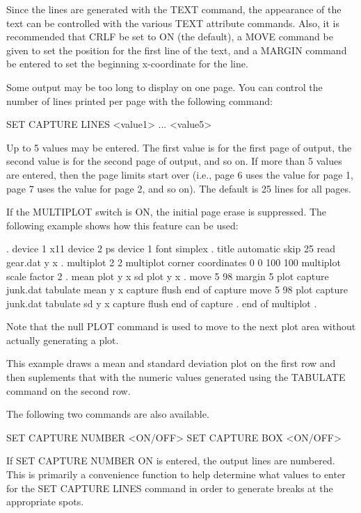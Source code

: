 {    Since the lines are generated with the TEXT command, the
    appearance of the text can be controlled with the various
    TEXT attribute commands.  Also, it is recommended that
    CRLF be set to ON (the default), a MOVE command be given to
    set the position for the first line of the text, and a MARGIN
    command be entered to set the beginning x-coordinate for the
    line.

    Some output may be too long to display on one page.  You
    can control the number of lines printed per page with the
    following command:

        SET CAPTURE LINES <value1>  ... <value5>

    Up to 5 values may be entered.  The first value is for the
    first page of output, the second value is for the second
    page of output, and so on.  If more than 5 values are
    entered, then the page limits start over (i.e., page 6 uses
    the value for page 1, page 7 uses the value for page 2, and
    so on).  The default is 25 lines for all pages.

    If the MULTIPLOT switch is ON, the initial page erase is
    suppressed.  The following example shows how this feature
    can be used:

       .
       device 1 x11
       device 2 ps
       device 1 font simplex
       .
       title automatic
       skip 25
       read gear.dat y x
       .
       multiplot 2 2
       multiplot corner coordinates 0 0 100 100
       multiplot scale factor 2
       .
       mean plot y x
       sd plot y x
       .
       move 5 98
       margin 5
       plot
       capture junk.dat
       tabulate mean y x
       capture flush
       end of capture
       move 5 98
       plot
       capture junk.dat
       tabulate sd y x
       capture flush
       end of capture
       .
       end of multiplot
       .

    Note that the null PLOT command is used to move to the
    next plot area without actually generating a plot.

    This example draws a mean and standard deviation plot
    on the first row and then suplements that with the numeric
    values generated using the TABULATE command on the second
    row.

    The following two commands are also available.

        SET CAPTURE NUMBER  <ON/OFF>
        SET CAPTURE BOX   <ON/OFF>

    If SET CAPTURE NUMBER ON is entered, the output lines are
    numbered.  This is primarily a convenience function to help
    determine what values to enter for the SET CAPTURE LINES command
    in order to generate breaks at the appropriate spots.

}
